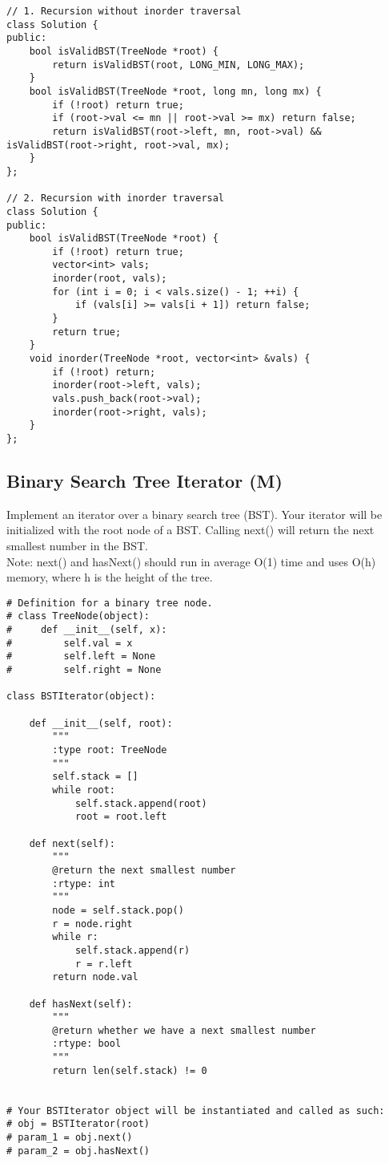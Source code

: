 \begin{lstlisting}
// 1. Recursion without inorder traversal
class Solution {
public:
    bool isValidBST(TreeNode *root) {
        return isValidBST(root, LONG_MIN, LONG_MAX);
    }
    bool isValidBST(TreeNode *root, long mn, long mx) {
        if (!root) return true;
        if (root->val <= mn || root->val >= mx) return false;
        return isValidBST(root->left, mn, root->val) && isValidBST(root->right, root->val, mx);
    }
};

// 2. Recursion with inorder traversal
class Solution {
public:
    bool isValidBST(TreeNode *root) {
        if (!root) return true;
        vector<int> vals;
        inorder(root, vals);
        for (int i = 0; i < vals.size() - 1; ++i) {
            if (vals[i] >= vals[i + 1]) return false;
        }
        return true;
    }
    void inorder(TreeNode *root, vector<int> &vals) {
        if (!root) return;
        inorder(root->left, vals);
        vals.push_back(root->val);
        inorder(root->right, vals);
    }
};
\end{lstlisting}


\subsection{Binary Search Tree Iterator (M)}
Implement an iterator over a binary search tree (BST). Your iterator will be initialized with the root node of a BST. Calling next() will return the next smallest number in the BST.\\

Note: next() and hasNext() should run in average O(1) time and uses O(h) memory, where h is the height of the tree. \\

\begin{lstlisting}
# Definition for a binary tree node.
# class TreeNode(object):
#     def __init__(self, x):
#         self.val = x
#         self.left = None
#         self.right = None

class BSTIterator(object):

    def __init__(self, root):
        """
        :type root: TreeNode
        """
        self.stack = []
        while root:
            self.stack.append(root)
            root = root.left
        
    def next(self):
        """
        @return the next smallest number
        :rtype: int
        """
        node = self.stack.pop()
        r = node.right
        while r:
            self.stack.append(r)
            r = r.left
        return node.val

    def hasNext(self):
        """
        @return whether we have a next smallest number
        :rtype: bool
        """
        return len(self.stack) != 0


# Your BSTIterator object will be instantiated and called as such:
# obj = BSTIterator(root)
# param_1 = obj.next()
# param_2 = obj.hasNext()
\end{lstlisting}

